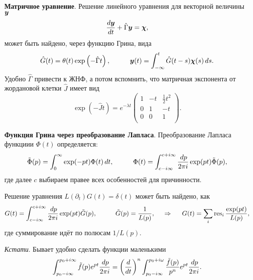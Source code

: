 \textbf{Матричное уравнение}. Решение линейного уравнения для векторной величины $\mbox{\boldmath $y$}$
\begin{equation*}
    \frac{d \mbox{\boldmath $y$}}{d t} + \hat{\Gamma} \mbox{\boldmath $y$} = \mbox{\boldmath $\chi$},
\end{equation*}
может быть найдено, через функцию Грина, вида
\begin{equation}
    \hat{G} (t) = \theta(t) \exp\left(- \hat{\Gamma} t\right),
    \hspace{10 mm} 
    \vc{y}(t) = \int_{-\infty}^{t}  \hat{G}(t-s) \vc{\chi}(s) \d s.
\end{equation}
Удобно $\hat{\Gamma}$ привести к ЖНФ, а потом вспомнить, что матричная экспонента от жордановой клетки $\hat{J}$ имеет вид
\begin{equation*}
    \exp\left(- \hat{J} t\right) = e^{- \lambda t}
    \left(
    \begin{array}{ccc}
     1 & -t & \frac{1}{2}t^2 \\
     0 & 1 & -t \\
     0 & 0 & 1 \\
    \end{array}
    \right).
\end{equation*}




\textbf{Функция Грина через преобразование Лапласа}. Преобразование Лапласа функциии $\Phi(t)$ определяется:
\begin{equation*}
    \tilde{\Phi}(p) = \int_{0}^{\infty}  \exp(-pt) \Phi(t) \d t,
    \hspace{10 mm} 
    \Phi(t) = \int_{c-i \infty}^{c+i \infty} \frac{\d p}{2 \pi i} \exp(pt) \tilde{\Phi}(p),
\end{equation*}
где далее $c$ выбираем правее всех особенностей для причинности. 

Решение уравнения $L(\partial_t) G(t) = \delta(t)$ может быть найдено, как
\begin{equation}
    G(t) = \int_{c-i \infty}^{c+i \infty} \frac{\d p}{2 \pi i} \exp(p t) \tilde{G}(p),
    \hspace{10 mm} \tilde{G} (p) = \frac{1}{L(p)},
    \hspace{0.5cm} \Rightarrow \hspace{0.5cm}
    G(t) = \sum_i \res_i \frac{\exp(pt)}{L(p)},
\end{equation}
где суммирование идёт по полюсам $1/L(p)$. 

\textit{Кстати}. Бывает удобно сделать функции маленькими
\begin{equation*}
    \int_{p_0 - i \infty}^{p_0 + i \infty} \tilde{f}(p) e^{pt} \frac{\, d p}{2 \pi i} = 
    \left(\frac{d }{d t} \right)^n \int_{p_0 - i \infty}^{p_0 + i \omega} \frac{\tilde{f}(p)}{p^n} e^{pt} \frac{\, d p}{2 \pi i}.
\end{equation*}







